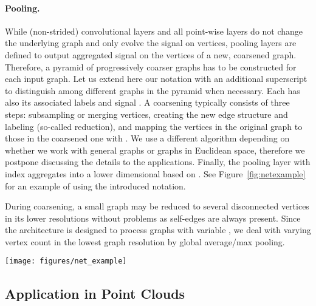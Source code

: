 \documentclass[10pt,twocolumn,letterpaper]{article}
\begin{document}
\paragraph*{Pooling.} While (non-strided) convolutional layers and all point-wise layers do not change the underlying graph and only evolve the signal on vertices, pooling layers are defined to output aggregated signal on the vertices of a new, coarsened graph. Therefore, a pyramid of  progressively coarser graphs has to be constructed for each input graph. Let us extend here our notation with an additional superscript  to distinguish among different graphs  in the pyramid when necessary. Each  has also its associated labels  and signal .
A coarsening typically consists of three steps: subsampling or merging vertices, creating the new edge structure  and labeling  (so-called reduction), and mapping the vertices in the original graph to those in the coarsened one with . We use a different algorithm depending on whether we work with general graphs or graphs in Euclidean space, therefore we postpone discussing the details to the applications. Finally, the pooling layer with index  aggregates  into a lower dimensional  based on . See Figure~\ref{fig:netexample} for an example of using the introduced notation. 

During coarsening, a small graph may be reduced to several disconnected vertices in its lower resolutions without problems as self-edges are always present. Since the architecture is designed to process graphs with variable , we deal with varying vertex count  in the lowest graph resolution by global average/max pooling. 


\begin{figure*}[bt]
\centering
\texttt{[image: figures/net\_example]}
\vspace{1.5ex}
\caption{\label{fig:netexample} Illustration of a deep network with three edge-conditioned convolutions (first, fourth, and eight network layer) and one pooling (seventh layer). The last convolution is executed on a structurally different graph , which is related to the input graph  by coarsening and signal aggregation in the max pooling step according to mapping . See Section~\ref{subsec:eccnet} for more details.}
\end{figure*}


\subsection{Application in Point Clouds} \label{subsec:applclouds}
\end{document}
